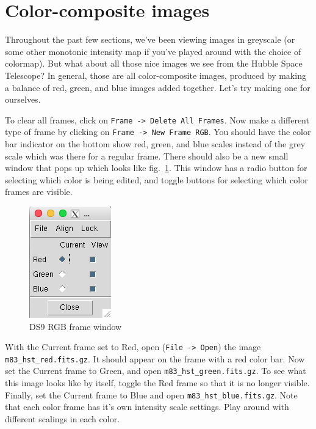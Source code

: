 \documentclass[12pt]{article}
\begin{document}
\section{Color-composite images}
\label{sec:color}

Throughout the past few sections, we've been viewing images in greyscale (or some other monotonic intensity map if you've played around with the choice of colormap).  But what about all those nice images we see from the Hubble Space Telescope?  In general, those are all color-composite images, produced by making a balance of red, green, and blue images added together.  Let's try making one for ourselves.  

To clear all frames, click on \texttt{Frame -> Delete All Frames}.  Now make a different type of frame by clicking on \texttt{Frame -> New Frame RGB}.  You should have the color bar indicator on the bottom show red, green, and blue scales instead of the grey scale which was there for a regular frame.  There should also be a new small window that pops up which looks like fig.~\ref{fig:rgb}. This window has a radio button for selecting which color is being edited, and toggle buttons for selecting which color frames are visible. 

\begin{figure}[h]
  \centering
  \includegraphics[width=0.3\linewidth]{rgb.png}
  \caption{DS9 RGB frame window}
  \label{fig:rgb}
\end{figure}

With the Current frame set to Red, open (\texttt{File -> Open}) the image \texttt{m83\_hst\_red.fits.gz}.  It should appear on the frame with a red color bar.  Now set the Current frame to Green, and open \texttt{m83\_hst\_green.fits.gz}.  To see what this image looks like by itself, toggle the Red frame so that it is no longer visible.  Finally, set the Current frame to Blue and open \texttt{m83\_hst\_blue.fits.gz}.  Note that each color frame has it's own intensity scale settings.  Play around with different scalings in each color.
\end{document}
